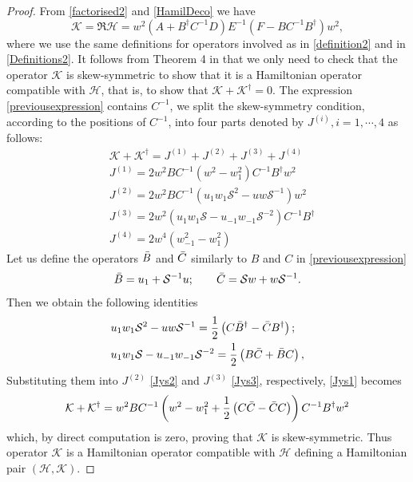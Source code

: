 \documentclass{article}
\numberwithin{equation}{section}
\begin{document}
	\begin{proof} From \eqref{factorised2} and \eqref{HamilDeco} we have
		\begin{equation}
			\mathcal{K} = \mathfrak{R}\mathcal{H}=w^2 \left(A + B^\dagger C^{-1} D\right)
E^{-1}\left(F - B C^{-1} B^\dagger\right) w^2,
			\label{previousexpression}
		\end{equation}
where we use the same definitions for operators involved as in \eqref{definition2} and in \eqref{Definitions2}.
It follows from Theorem 4 in \cite{42} that we only need to
check that the operator $\mathcal{K}$ is skew-symmetric to show that
it is a Hamiltonian operator compatible
with $\mathcal{H}$, that is, to show that $\mathcal{K}+\mathcal{K}^\dagger=0$.
		The expression \eqref{previousexpression} contains $C^{-1}$, we split the skew-symmetry condition, according to the
positions of $C^{-1}$, into four parts denoted by  $J^{(i)}, i=1, \cdots, 4$ as follows:
		\begin{subequations}
			\begin{align}
				& \mathcal{K} + \mathcal{K}^\dagger = 
J^{(1)}+J^{(2)}+J^{(3)}+J^{(4)} \label{Jys1}\\
				& J^{(1)} = 2 w^2 B C^{-1} 
\left(w^2-w_1^2\right) C^{-1} B^{\dagger} w^2\\
				& J^{(2)} = 2 w^2 B C^{-1} \left( u_1 w_1 
\mathcal{S}^2- u w \mathcal{S}^{-1} \right) w^2 \label{Jys2}\\
				& J^{(3)} = 2 w^2 \left(u_1 w_1 
\mathcal{S}-u_{-1}w_{-1} \mathcal{S}^{-2}\right) C^{-1} B^\dagger \label{Jys3}\\
				& J^{(4)} = 2 w^4 \left( w_{-1}^2 -w_1^2\right)
			\end{align}
			\label{Jys}
		\end{subequations}
Let us define the operators $\Bar{B}$ and $\Bar{C}$ similarly to $B$ and
$C$ in \eqref{previousexpression}
		\begin{equation*}
			\Bar{B} = u_1 + \mathcal{S}^{-1} u;\qquad \Bar{C} =
\mathcal{S} w + w \mathcal{S}^{-1}.
		\end{equation*}
Then we obtain the following identities
		\begin{subequations}
			\begin{align*}
				&  u_1 w_1 \mathcal{S}^2- u w \mathcal{S}^{-1} = 
\frac{1}{2} \left( C \Bar{B}^\dagger-\Bar{C} B^\dagger \right);\\
				&  u_1 w_1 \mathcal{S} - u_{-1}w_{-1} 
\mathcal{S}^{-2} = \frac{1}{2} \left(B \Bar{C}+\Bar{B} C\right),
			\end{align*}
		\end{subequations}
Substituting them into  $J^{(2)}$ \eqref{Jys2} and $J^{(3)}$ \eqref{Jys3}, respectively,  \eqref{Jys1} becomes
		\begin{equation*}
			\mathcal{K} + \mathcal{K}^\dagger  = w^2 B C^{-1} 
\left(w^2-w_1^2 + \frac{1}{2} \left( C \Bar{C} - \Bar{C} C \right)\right) C^{-1} 
B^{\dagger} w^2
		\end{equation*}
		which, by direct computation is zero, proving that $\mathcal{K}$ 
is skew-symmetric. Thus  operator $\mathcal{K}$ is a Hamiltonian operator
compatible with $\mathcal{H}$ defining a Hamiltonian pair
$(\mathcal{H},\mathcal{K})$.
\end{proof}
\end{document}
